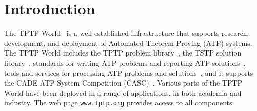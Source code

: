 \documentclass{ceurart}
\begin{document}
\section{Introduction}
\label{Introduction}

The TPTP World~\cite{Sut17} is a well established infrastructure that supports research, 
development, and deployment of Automated Theorem Proving (ATP) systems.
The TPTP World includes the TPTP problem library~\cite{Sut09}, 
the TSTP solution library~\cite{Sut10}, 
standards for writing ATP problems and reporting ATP solutions~\cite{SS+06,Sut08-KEAPPA}, 
tools and services for processing ATP problems and solutions~\cite{Sut10}, 
and it supports the CADE ATP System Competition (CASC)~\cite{Sut16}.
Various parts of the TPTP World have been deployed in a range of applications,
in both academia and industry.
The web page \href{https://www.tptp.org}{\tt www.tptp.org} provides access to all 
components.
\end{document}
